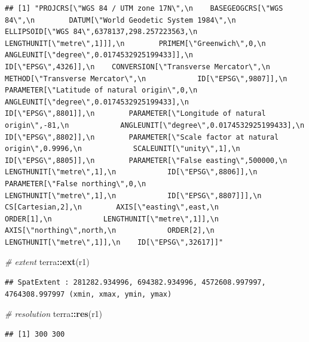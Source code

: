 \documentclass[
]{article}
\newenvironment{Shaded}{\begin{snugshade}}{\end{snugshade}}
\newcommand{\CommentTok}[1]{\textcolor[rgb]{0.56,0.35,0.01}{\textit{#1}}}
\newcommand{\FunctionTok}[1]{\textcolor[rgb]{0.13,0.29,0.53}{\textbf{#1}}}
\newcommand{\NormalTok}[1]{#1}
\newcommand{\SpecialCharTok}[1]{\textcolor[rgb]{0.81,0.36,0.00}{\textbf{#1}}}
\begin{document}
\begin{verbatim}
## [1] "PROJCRS[\"WGS 84 / UTM zone 17N\",\n    BASEGEOGCRS[\"WGS 84\",\n        DATUM[\"World Geodetic System 1984\",\n            ELLIPSOID[\"WGS 84\",6378137,298.257223563,\n                LENGTHUNIT[\"metre\",1]]],\n        PRIMEM[\"Greenwich\",0,\n            ANGLEUNIT[\"degree\",0.0174532925199433]],\n        ID[\"EPSG\",4326]],\n    CONVERSION[\"Transverse Mercator\",\n        METHOD[\"Transverse Mercator\",\n            ID[\"EPSG\",9807]],\n        PARAMETER[\"Latitude of natural origin\",0,\n            ANGLEUNIT[\"degree\",0.0174532925199433],\n            ID[\"EPSG\",8801]],\n        PARAMETER[\"Longitude of natural origin\",-81,\n            ANGLEUNIT[\"degree\",0.0174532925199433],\n            ID[\"EPSG\",8802]],\n        PARAMETER[\"Scale factor at natural origin\",0.9996,\n            SCALEUNIT[\"unity\",1],\n            ID[\"EPSG\",8805]],\n        PARAMETER[\"False easting\",500000,\n            LENGTHUNIT[\"metre\",1],\n            ID[\"EPSG\",8806]],\n        PARAMETER[\"False northing\",0,\n            LENGTHUNIT[\"metre\",1],\n            ID[\"EPSG\",8807]]],\n    CS[Cartesian,2],\n        AXIS[\"easting\",east,\n            ORDER[1],\n            LENGTHUNIT[\"metre\",1]],\n        AXIS[\"northing\",north,\n            ORDER[2],\n            LENGTHUNIT[\"metre\",1]],\n    ID[\"EPSG\",32617]]"
\end{verbatim}

\begin{Shaded}
\begin{Highlighting}[]
\CommentTok{\# extent}
\NormalTok{terra}\SpecialCharTok{::}\FunctionTok{ext}\NormalTok{(r1)}
\end{Highlighting}
\end{Shaded}

\begin{verbatim}
## SpatExtent : 281282.934996, 694382.934996, 4572608.997997, 4764308.997997 (xmin, xmax, ymin, ymax)
\end{verbatim}

\begin{Shaded}
\begin{Highlighting}[]
\CommentTok{\# resolution}
\NormalTok{terra}\SpecialCharTok{::}\FunctionTok{res}\NormalTok{(r1)}
\end{Highlighting}
\end{Shaded}

\begin{verbatim}
## [1] 300 300
\end{verbatim}
\end{document}
